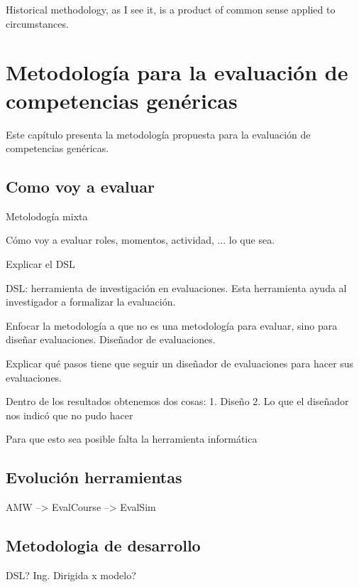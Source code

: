 

\begin{savequote}[50mm]
Historical methodology, as I see it, is a product of common sense applied to circumstances. 
\end{savequote}


\chapter{Metodología para la evaluación de competencias genéricas}
\label{cha:Overall methodology}

\ifpdf
    \graphicspath{{3_overall_methodology/figures/PNG/}{3_overall_methodology/figures/PDF/}{3_overall_methodology/figures/}}
\else
    \graphicspath{{3_overall_methodology/figures/EPS/}{3_overall_methodology/figures/}}
\fi



\cite{turing1950computing}

Este capítulo presenta la metodología propuesta para la evaluación de competencias genéricas.

\section{Como voy a evaluar}

Metolodogía mixta

Cómo voy a evaluar roles, momentos, actividad, ... lo que sea.

Explicar el DSL

DSL: herramienta de investigación en evaluaciones. Esta herramienta ayuda al investigador a formalizar la evaluación.
 
Enfocar la metodología a que no es una metodología para evaluar, sino para diseñar evaluaciones. Diseñador de evaluaciones.

Explicar qué pasos tiene que seguir un diseñador de evaluaciones para hacer sus evaluaciones.

Dentro de los resultados obtenemos dos cosas:
1. Diseño
2. Lo que el diseñador nos indicó que no pudo hacer

Para que esto sea posible falta la herramienta informática

\section{Evolución herramientas}

AMW --> EvalCourse --> EvalSim

\section{Metodologia de desarrollo}

DSL? Ing. Dirigida x modelo?




